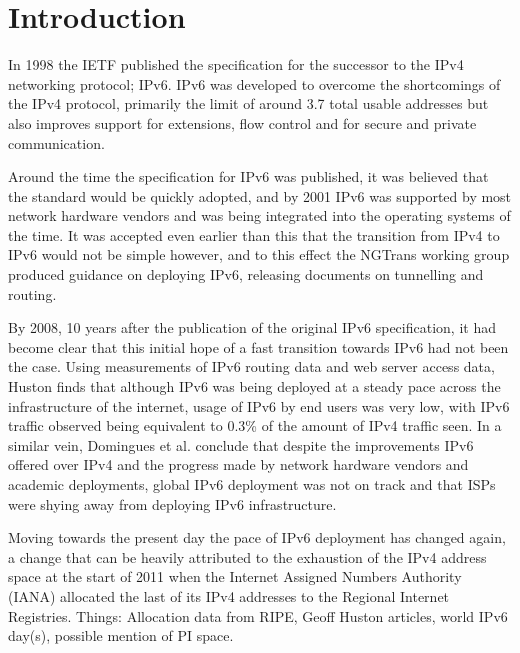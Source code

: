 \section{Introduction}

In 1998 the IETF published the specification for the successor to the IPv4
networking protocol; IPv6. IPv6 was developed to overcome the shortcomings
of the IPv4 protocol, primarily the limit of around 3.7 total usable
addresses\cite{beijnum_ip} but also improves support for extensions, flow
control and for secure and private communication\cite{rfc2460}.

Around the time the specification for IPv6 was published, it was believed that
the standard would be quickly adopted, and by 2001 IPv6 was supported by most
network hardware vendors and was being integrated into the operating systems of
the time\cite{huang_ipv6_2000}\cite{durand_deploying_2001}. It was accepted even
earlier than this that
the transition from IPv4 to IPv6 would not be simple however, and to this effect
the NGTrans working group produced guidance on deploying IPv6, releasing
documents on tunnelling\cite{rfc1933}\cite{rfc2893} and routing\cite{rfc2185}. 

By 2008, 10 years after the publication of the original IPv6
specification, it had become clear that this initial hope of a fast
transition towards IPv6 had not been the case. Using measurements of IPv6 routing
data and web server access data, Huston finds that although IPv6 was being
deployed at a steady pace across the infrastructure of the internet, usage of
IPv6 by end users was very low, with IPv6 traffic observed being equivalent to
0.3\% of the amount of IPv4 traffic seen\cite{huston_ipv6_????}. In a similar vein, Domingues 
et al. conclude that despite the improvements IPv6 offered over IPv4
and the progress made by network hardware vendors and academic deployments,
global IPv6 deployment was not on track and that ISPs were shying away from
deploying IPv6 infrastructure\cite{domingues_is_2007}.

Moving towards the present day the pace of IPv6 deployment has changed again, a
change that can be heavily attributed to the exhaustion of the IPv4 address
space at the start of 2011 when the Internet Assigned Numbers Authority (IANA)
allocated the last of its IPv4 addresses to the Regional Internet Registries.
Things: Allocation data from RIPE, Geoff Huston articles, world IPv6 day(s),
possible mention of PI space.

